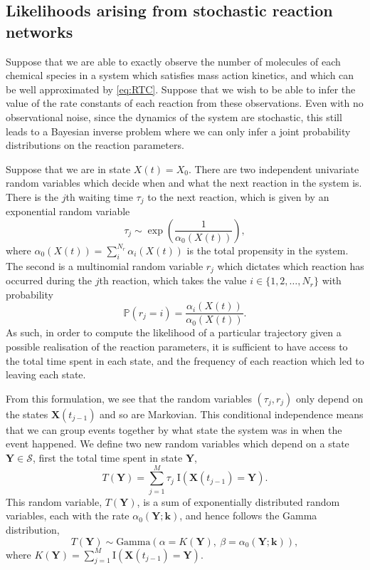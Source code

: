 
\subsection{Likelihoods arising from stochastic reaction networks}
Suppose that we are able to exactly observe the number of molecules of
each chemical species in a system which satisfies mass action
kinetics, and which can be well approximated by
\eqref{eq:RTC}. Suppose that we wish to be able to infer the value of
the rate constants of each reaction from these observations. Even with no observational noise, since the dynamics
of the system are stochastic, this still leads to a Bayesian inverse
problem where we can only infer a joint probability distributions on the
reaction parameters.

Suppose that we are in state $X(t) = X_0$. There are two independent
univariate random variables which decide when and what the next
reaction in the system is. There is the $j$th waiting time $\tau_j$ to the
next reaction, which is given by an exponential random variable
\begin{equation}\tau_j \sim \exp \left ( \frac{1}{\alpha_0(X(t))} \right ),\end{equation}
where $\alpha_0(X(t)) =\sum_{i}^{N_r} \alpha_i(X(t))$ is the total
propensity in the system. The second is a multinomial random variable $r_j$
which dictates which reaction has occurred during the $j$th reaction,
which takes the value
$i \in \{1,2,\ldots,N_r\}$ with probability
\begin{equation}\mathbb{P}(r_j = i) = \frac{\alpha_i(X(t))}{\alpha_0(X(t))}.\end{equation}
As such, in order to compute the likelihood of a particular trajectory
given a possible realisation of the reaction parameters, it is
sufficient to have access to the total time spent in each state, and
the frequency of each reaction which led to leaving each state.

From this formulation, we see that the random variables $(\tau_j, r_j)$ only depend on the states $\mathbf{X}(t_{j-1})$ and so are Markovian. This conditional independence means that we can group events together by what state the system was in when the event happened. We define two new random variables which depend on a state $\mathbf{Y} \in \mathcal{S}$, first the total time spent in state $\mathbf{Y}$,
\begin{equation}
	T(\mathbf{Y}) = \sum\limits_{j=1}^M \tau_j\; \text{I}(\mathbf{X}(t_{j-1}) = \mathbf{Y}).
\end{equation}
This random variable, $T(\mathbf{Y})$, is a sum of exponentially
distributed random variables, each with the rate $\alpha_0(\mathbf{Y};\mathbf{k})$, and hence follows the Gamma distribution,
\begin{equation}\label{eqn:chem_time_dist}
	T(\mathbf{Y}) \sim \text{Gamma}\left(\alpha=K(\mathbf{Y}),~\beta = \alpha_0(\mathbf{Y}; \mathbf{k})\right),
\end{equation}
where $K(\mathbf{Y}) = \sum\limits_{j=1}^M \text{I}(\mathbf{X}(t_{j-1}) = \mathbf{Y})$.

